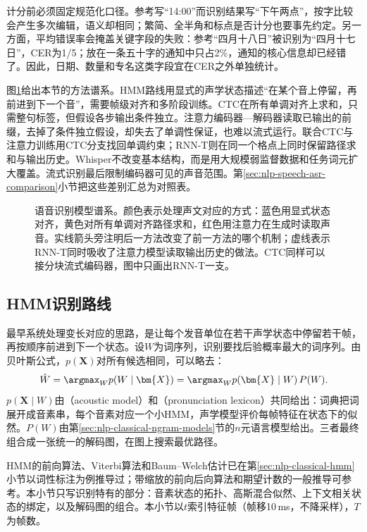 计分前必须固定规范化口径。参考写“14:00”而识别结果写“下午两点”，按字比较会产生多次编辑，语义却相同；繁简、全半角和标点是否计分也要事先约定。另一方面，平均错误率会掩盖关键字段的失败：参考“四月十八日”被识别为“四月十七日”，CER为1/5；放在一条五十字的通知中只占2\%，通知的核心信息却已经错了。因此，日期、数量和专名这类字段宜在CER之外单独统计。

图\ref{fig:nlp-speech-asr-lineage}给出本节的方法谱系。HMM路线用显式的声学状态描述“在某个音上停留，再前进到下一个音”，需要帧级对齐和多阶段训练。CTC在所有单调对齐上求和，只需整句标签，但假设各步输出条件独立。注意力编码器—解码器读取已输出的前缀，去掉了条件独立假设，却失去了单调性保证，也难以流式运行。联合CTC与注意力训练用CTC分支找回单调约束；RNN-T则在同一个格点上同时保留路径求和与输出历史。Whisper不改变基本结构，而是用大规模弱监督数据和任务词元扩大覆盖。流式识别最后限制编码器可见的声音范围。第\ref{sec:nlp-speech-asr-comparison}小节把这些差别汇总为对照表。

\begin{figure}[htbp]
  \centering
  
  \caption{语音识别模型谱系。颜色表示处理声文对应的方式：蓝色用显式状态对齐，黄色对所有单调对齐路径求和，红色用注意力在生成时读取声音。实线箭头旁注明后一方法改变了前一方法的哪个机制；虚线表示RNN-T同时吸收了注意力模型读取输出历史的做法。CTC同样可以接分块流式编码器，图中只画出RNN-T一支。}
  \label{fig:nlp-speech-asr-lineage}
\end{figure}

\subsection{HMM识别路线}
\label{sec:nlp-speech-hmm}

最早系统处理变长对应的思路，是让每个发音单位在若干声学状态中停留若干帧，再按顺序前进到下一个状态。设$W$为词序列，识别要找后验概率最大的词序列。由贝叶斯公式，$p(\bm{X})$对所有候选相同，可以略去：
\begin{equation}
 \hat W=\argmax_W p(W\mid\bm{X})
       =\argmax_W p(\bm{X}\mid W)\,P(W).
 \label{eq:nlp-speech-noisy-channel}
\end{equation}
$p(\bm{X}\mid W)$由（acoustic model）和（pronunciation lexicon）共同给出：词典把词展开成音素串，每个音素对应一个小HMM，声学模型评价每帧特征在状态下的似然。$P(W)$由第\ref{sec:nlp-classical-ngram-models}节的$n$元语言模型给出。三者最终组合成一张统一的解码图，在图上搜索最优路径。

HMM的前向算法、Viterbi算法和Baum--Welch估计已在第\ref{sec:nlp-classical-hmm}小节以词性标注为例推导过；带缩放的前向后向算法和期望计数的一般推导可参考。本小节只写识别特有的部分：音素状态的拓扑、高斯混合似然、上下文相关状态的绑定，以及解码图的组合。本小节以$t$索引特征帧（帧移10\,ms，不降采样），$T$为帧数。

